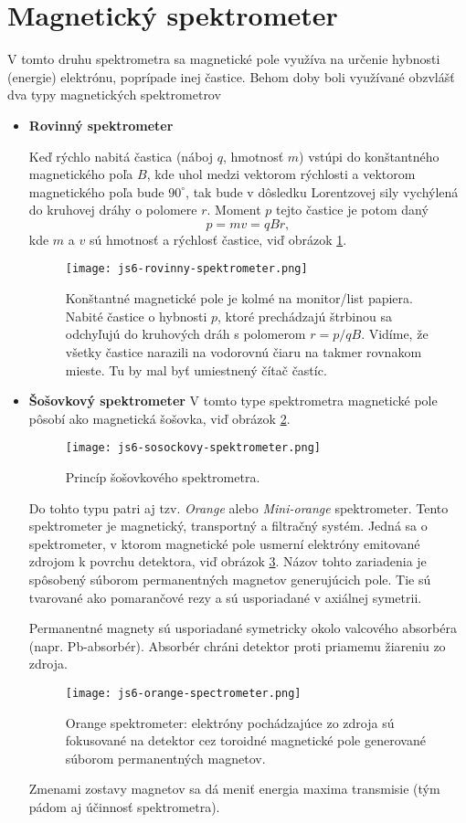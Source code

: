 \documentclass[../../main.tex]{subfiles}
\begin{document}
\section{Magnetický spektrometer}
V tomto druhu spektrometra sa magnetické pole využíva na určenie hybnosti (energie) elektrónu, poprípade inej častice. Behom doby boli využívané obzvlášť dva typy magnetických spektrometrov
\begin{itemize}
\item \textbf{Rovinný spektrometer}

Keď rýchlo nabitá častica (náboj $q$, hmotnosť $m$) vstúpi do konštantného magnetického poľa $B$, kde uhol medzi vektorom rýchlosti a vektorom magnetického poľa bude $90^{\circ}$, tak bude v dôsledku Lorentzovej sily vychýlená do kruhovej dráhy o polomere $r$. Moment $p$ tejto častice je potom daný
$$ p=mv=qBr,$$
kde $m$ a $v$ sú hmotnosť a rýchlosť častice, viď obrázok \ref{js6:fig:rovinny_spektrometer}.\par
\begin{figure}[!h]
 \centering
 \texttt{[image: js6-rovinny-spektrometer.png]}
 \caption{Konštantné magnetické pole je kolmé na monitor/list papiera. Nabité častice o hybnosti $p$, ktoré prechádzajú štrbinou sa odchyľujú do  kruhových dráh s polomerom $r=p/qB$. Vidíme, že všetky častice narazili na vodorovnú čiaru na takmer rovnakom mieste. Tu by mal byť umiestnený čítač častíc.}
 \label{js6:fig:rovinny_spektrometer}
\end{figure}
\item \textbf{Šošovkový spektrometer}
V tomto type spektrometra magnetické pole pôsobí ako magnetická šošovka, viď obrázok \ref{js6:fig:sosovkovy_spektrometer}.
\begin{figure}[!h]
 \centering
 \texttt{[image: js6-sosockovy-spektrometer.png]}
 \caption{Princíp šošovkového spektrometra.}
 \label{js6:fig:sosovkovy_spektrometer}
\end{figure} \newline
Do tohto typu patri aj tzv. \textit{Orange} alebo \textit{Mini-orange} spektrometer. Tento spektrometer je magnetický, transportný a filtračný systém. Jedná sa o spektrometer, v ktorom magnetické pole usmerní elektróny emitované zdrojom k povrchu detektora, viď obrázok \ref{js6:fig:orange_spektrometer}. Názov tohto zariadenia je spôsobený súborom permanentných magnetov generujúcich pole. Tie sú tvarované ako pomarančové rezy a sú usporiadané v axiálnej symetrii.

Permanentné magnety sú usporiadané symetricky okolo valcového absorbéra (napr. Pb-absorbér). Absorbér chráni detektor proti priamemu žiareniu zo zdroja.
\begin{figure}[!h]
 \centering
 \texttt{[image: js6-orange-spectrometer.png]}
 \caption{Orange spektrometer: elektróny pochádzajúce zo zdroja sú fokusované na detektor cez toroidné magnetické pole generované súborom permanentných magnetov.}
 \label{js6:fig:orange_spektrometer}
 \end{figure}
Zmenami zostavy magnetov sa dá meniť energia maxima transmisie (tým pádom aj účinnosť spektrometra).


\end{itemize}
\end{document}
